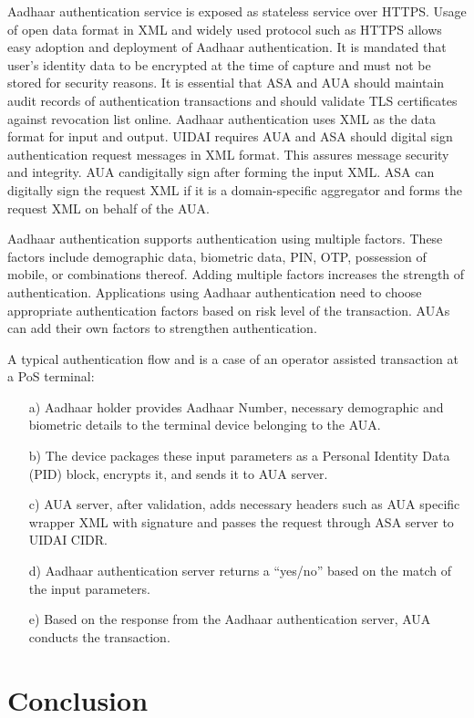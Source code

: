 \begin{multicols}{2}
Aadhaar authentication service is exposed as stateless service over HTTPS. Usage of open data format in XML and widely used protocol such as HTTPS allows easy adoption and deployment of Aadhaar authentication. It is mandated that user's identity data to be encrypted at the time of capture and must not be stored for security reasons. It is essential that ASA and AUA should maintain audit records of authentication transactions and should validate TLS certificates against revocation list online. Aadhaar authentication uses XML as the data format for input and output. UIDAI requires AUA and ASA should digital sign authentication request messages in XML format. This assures message security and integrity. AUA can\break digitally sign after forming the input XML. ASA can digitally sign the request XML if it is a domain-specific aggregator and forms the request XML on behalf of the AUA.

\vskip -2pt
 
Aadhaar authentication supports authentication using multiple factors. These factors include demographic data, biometric data, PIN, OTP, possession of mobile, or combinations thereof. Adding multiple factors increases the strength of authentication. Applications using Aadhaar authentication need to choose appropriate authentication factors based on risk level of the transaction. AUAs can add their own factors to strengthen authentication.
 
A typical authentication flow and is a case of an operator assisted transaction at a PoS terminal:
\begin{itemize}
\item[a)] Aadhaar holder provides Aadhaar Number, necessary demographic and biometric details to the terminal device belonging to the AUA.
\item[b)] The device packages these input parameters as a Personal Identity Data (PID) block, encrypts it, and sends it to AUA server.	
\item[c)] AUA server, after validation, adds necessary headers such as AUA specific wrapper XML with signature and passes the request through ASA server to UIDAI CIDR.	
\item[d)] Aadhaar authentication server returns a ``yes/no'' based on the match of the input parameters.
\item[e)] Based on the response from the Aadhaar authentication server, AUA conducts the transaction.
\end{itemize}

\section*{Conclusion}


\end{multicols}

